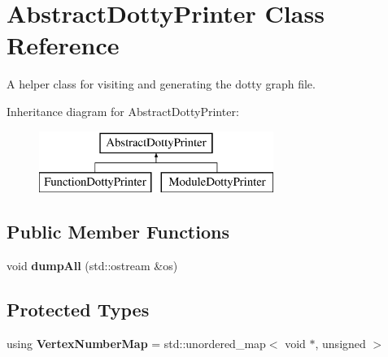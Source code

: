 \hypertarget{class_abstract_dotty_printer}{}\section{Abstract\+Dotty\+Printer Class Reference}
\label{class_abstract_dotty_printer}


A helper class for visiting and generating the dotty graph file.  


Inheritance diagram for Abstract\+Dotty\+Printer\+:\begin{figure}[H]
\begin{center}
\leavevmode
\includegraphics[height=2.000000cm]{class_abstract_dotty_printer}
\end{center}
\end{figure}
\subsection*{Public Member Functions}
\begin{DoxyCompactItemize}
\item 
\mbox{\label{class_abstract_dotty_printer_a0e5c39e3f6d24a29c56f871c300978a8}} 
void {\bfseries dump\+All} (std\+::ostream \&os)
\end{DoxyCompactItemize}
\subsection*{Protected Types}
\begin{DoxyCompactItemize}
\item 
\mbox{\label{class_abstract_dotty_printer_a9535123f72954dd24b5f8b1b59108e6b}} 
using {\bfseries Vertex\+Number\+Map} = std\+::unordered\+\_\+map$<$ void $\ast$, unsigned $>$
\end{DoxyCompactItemize}
